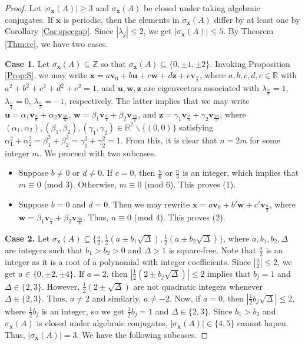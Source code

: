 \documentclass[11pt]{article}
\newcommand{\bv}{\mathbf v}
\newcommand{\bx}{\mathbf x}
\newcommand{\bz}{\mathbf z}
\newcommand{\bu}{\mathbf u}
\newcommand{\bw}{\mathbf w}
\def\R{\mathbb{R}}
\begin{document}
\begin{proof}
Let $|\sigma_{\bx}(A)|\geq 3$ and $\sigma_{\bx}(A)$ be closed under taking algebraic conjugates. If $\bx$ is periodic, then the elements in $\sigma_{\bx}(A)$ differ by at least one by Corollary \ref{Cor:specgap}. Since $|\lambda_j|\leq 2$, we get $|\sigma_{\bx}(A)|\leq 5$. By Theorem \ref{Thm:rc}, we have two cases.
\vspace{0.05in}

\noindent \textbf{Case 1.} Let $\sigma_{\bx}(A)\subseteq\mathbb{Z}$ so that $\sigma_{\bx}(A)\subseteq \{0,\pm 1,\pm 2\}$. Invoking Proposition \ref{Prop:S}, we may write $\bx=a\bv_0+b\bu+c\bw+d\bz+e\bv_{\frac{n}{2}}$, where $a,b,c,d,e\in\R$ with $a^2+b^2+c^2+d^2+e^2=1$, and $\bu,\bw,\bz$ are eigenvectors associated with $\lambda_{\frac{n}{6}}=1$, $\lambda_{\frac{n}{4}}=0$, $\lambda_{\frac{n}{3}}=-1$, respectively. The latter implies that we may write $\bu=\alpha_1\bv_{\frac{n}{6}}+\alpha_2\bv_{\frac{5n}{6}}$, $\bw=\beta_1\bv_{\frac{n}{4}}+\beta_2\bv_{\frac{3n}{4}}$, and $\bz=\gamma_1\bv_{\frac{n}{3}}+\gamma_2\bv_{\frac{2n}{3}}$, where $(\alpha_1,\alpha_2),(\beta_1,\beta_2),(\gamma_1,\gamma_2)\in\R^2\backslash\{(0,0)\}$ satisfying $\alpha_1^2+\alpha_2^2=\beta_1^2+\beta_2^2=\gamma_1^2+\gamma_2^2=1$. From this, it is clear that $n=2m$ for some integer $m$. We proceed with two subcases.
\begin{itemize}
    \item Suppose $b\neq 0$ or $d\neq 0$. If $c=0$, then $\frac{n}{6}$ or $\frac{n}{3}$ is an integer, which implies that $m\equiv 0$ (mod 3). Otherwise, $m\equiv 0$ (mod 6). This proves (1).
    \item Suppose $b=0$ and $d=0$. Then we may rewrite $\bx=a\bv_0+b'\bw+c'\bv_{\frac{n}{2}}$, where $\bw=\beta_1\bv_{\frac{n}{4}}+\beta_2\bv_{\frac{3n}{4}}$. Thus, $n\equiv 0$ (mod 4). This proves (2).
\end{itemize}

\noindent \textbf{Case 2.} Let $\sigma_{\bx}(A)\subseteq\{\frac{a}{2},\frac{1}{2}(a\pm b_1\sqrt{\Delta}),\frac{1}{2}(a\pm b_2\sqrt{\Delta})\}$, where $a,b_1,b_2,\Delta$ are integers such that $b_1>b_2>0$ and $\Delta>1$ is square-free. Note that $\frac{a}{2}$ is an integer as it is a root of a polynomial with integer coefficients. Since $|\frac{a}{2}|\leq 2$, we get $a\in\{0,\pm 2,\pm 4\}$. If $a=2$, then $|\frac{1}{2}(2\pm b_j\sqrt{\Delta})|\leq 2$ implies that $b_j=1$ and $\Delta\in\{2,3\}$. However, $\frac{1}{2}(2\pm \sqrt{\Delta})$ are not quadratic integers whenever $\Delta\in\{2,3\}$. Thus, $a\neq 2$ and similarly, $a\neq -2$. Now, if $a=0$, then $|\frac{1}{2}b_j\sqrt{\Delta}|\leq 2$, where $\frac{1}{2}b_j$ is an integer, so we get $\frac{1}{2}b_j=1$ and $\Delta\in\{2,3\}$. Since $b_1>b_2$ and $\sigma_{\bx}(A)$ is closed under algebraic conjugates, $|\sigma_{\bx}(A)|\in\{4,5\}$ cannot hapen. Thus, $|\sigma_{\bx}(A)|=3$. We have the following subcases.


\end{proof}
\end{document}
